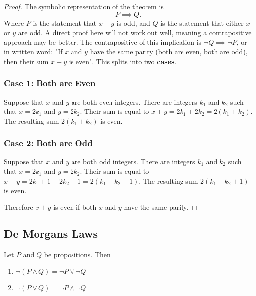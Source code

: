 \documentclass[../notes.tex]{subfiles}
\begin{document}
\begin{proof}
	The symbolic representation of the theorem is
	\[
	  P \implies Q
	.\]
	Where $P$ is the statement that $x+y$ is odd, and $Q$ is the statement that either $x$ or $y$ are odd. A direct proof here will not work out well, meaning a contrapositive approach may be better. The contrapositive of this implication is $\lnot Q \implies \lnot P$, or in written word: "If $x$ and $y$ have the same parity (both are even, both are odd), then their sum $x+y$ is even". This splits into two \textbf{cases}.

	\subsubsection*{Case 1: Both are Even}

	Suppose that $x$ and $y$ are both even integers. There are integers $k_{1}$ and $k_{2}$ such that $x = 2 k_{1}$ and $y = 2 k_{2}$. Their sum is equal to $x + y = 2 k_{1} + 2 k_{2} = 2 (k_{1} + k_{2})$. The resulting sum $2(k_{1} + k_{2})$ is even.

	\subsubsection*{Case 2: Both are Odd}

	Suppose that $x$ and $y$ are both odd integers. There are integers $k_{1}$ and $k_{2}$ such that $x = 2 k_{1}$ and $y = 2 k_{2}$. Their sum is equal to $x + y = 2 k_{1} + 1 + 2 k_{2} + 1 = 2 (k_{1} + k_{2} + 1)$. The resulting sum $2(k_{1} + k_{2} + 1)$ is even.
	
	\vspace{1cm}\noindent
	Therefore $x+y$ is even if both $x$ and $y$ have the same parity.
\end{proof}

\subsection{De Morgans Laws}

\begin{theorem}
	Let $P$ and $Q$ be propositions. Then
	\begin{enumerate}
		\item $\lnot (P \land Q) = \lnot P \lor \lnot Q$
		\item $\lnot (P \lor Q) = \lnot P \land \lnot Q$
	\end{enumerate}
\end{theorem}
\end{document}

